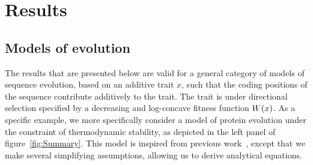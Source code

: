 \section{Results}

\subsection{Models of evolution}

The results that are presented below are valid for a general category of models of sequence evolution, based on an additive trait $x$, such that the coding positions of the sequence contribute additively to the trait.
The trait is under directional selection specified by a decreasing and log-concave fitness function $ W (x)$.
As a specific example, we more specifically consider a model of protein evolution under the constraint of thermodynamic stability, as depicted in the left panel of figure~\ref{fig:Summary}.
This model is inspired from previous work~\citep{Williams2006, Goldstein2011, Pollock2012}, except that we make several simplifying assumptions, allowing us to derive analytical equations.


